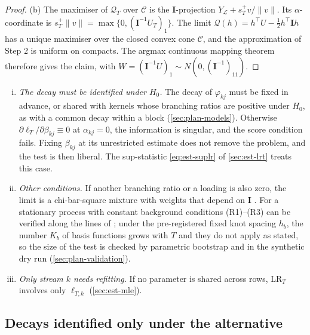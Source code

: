 \begin{proof}
(b) The maximiser of $\mathcal Q_T$ over $\mathcal C$ is the $\bm I$-projection
$Y_{\mathcal L}+s_T^+v/\|v\|$. Its $\alpha$-coordinate is
$s_T^+\|v\|=\max\{0,(\bm I^{-1}U_T)_1\}$. The limit $\mathcal Q(h)=h^{\top}U-\tfrac12h^{\top}\bm Ih$ has a unique maximiser over the
closed convex cone $\mathcal C$, and the approximation of Step 2 is uniform on compacts. The
argmax continuous mapping theorem \citep[Thm~3.2.2]{vandervaart1996} therefore gives the
claim, with $W=(\bm I^{-1}U)_1\sim N(0,(\bm I^{-1})_{11})$.
\end{proof}

\begin{remark}\label{rem:est-lrt}
\begin{enumerate}[(i)]
  \item \emph{The decay must be identified under $H_0$.} The decay of $\varphi_{kj}$ must
    be fixed in advance, or shared with kernels whose branching ratios are positive under
    $H_0$, as with a common decay within a block (\cref{sec:plan-models}). Otherwise
    $\partial\ell_T/\partial\beta_{kj}\equiv0$ at $\alpha_{kj}=0$, the information is
    singular, and the score condition fails. Fixing $\beta_{kj}$ at its unrestricted
    estimate does not remove the problem, and the test is then liberal. The sup-statistic
    \eqref{eq:est-suplr} of \cref{sec:est-lrt} treats this case.
  \item \emph{Other conditions.} If another branching ratio or a loading is also zero, the
    limit is a chi-bar-square mixture with weights that depend on $\bm I$
    \citep{self1987}. For a stationary process with constant background conditions (R1)--(R3)
    can be verified along the lines of \citet{ogata1978}; under the
    pre-registered fixed knot spacing $h_b$, the number $K_b$ of basis functions grows with
    $T$ and they do not apply as stated, so the size of the test is checked by parametric
    bootstrap and in the synthetic dry run (\cref{sec:plan-validation}).
  \item \emph{Only stream $k$ needs refitting.} If no parameter is shared across rows,
    $\mathrm{LR}_T$ involves only $\ell_{T,k}$ (\cref{sec:est-mle}).
\end{enumerate}
\end{remark}

\subsection{Decays identified only under the alternative}\label{app:est-davies}

